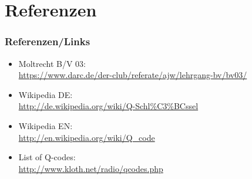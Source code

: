 \section*{Referenzen}

\begin{frame}
  \frametitle{Referenzen/Links}

  \footnotesize
  \begin{itemize}
    \item Moltrecht B/V 03: \\
      \url{https://www.darc.de/der-club/referate/ajw/lehrgang-bv/bv03/}
    \item Wikipedia DE: \\
      \url{http://de.wikipedia.org/wiki/Q-Schl\%C3\%BCssel}
    \item Wikipedia EN: \\
      \url{http://en.wikipedia.org/wiki/Q_code}
    \item List of Q-codes: \\
      \url{http://www.kloth.net/radio/qcodes.php}
  \end{itemize}

\end{frame}


